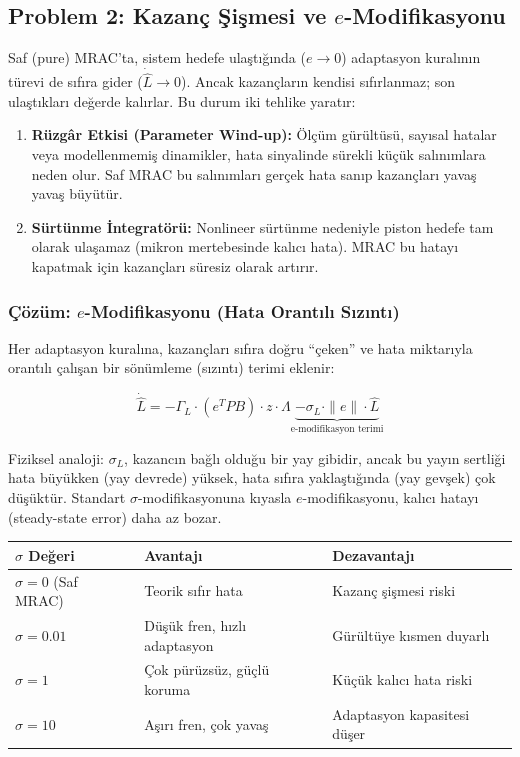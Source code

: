 \documentclass[12pt,a4paper]{article}
\begin{document}
\subsection{Problem 2: Kazanç Şişmesi ve $e$-Modifikasyonu}
\label{subsec:sigma}

Saf (pure) MRAC'ta, sistem hedefe ulaştığında ($e \to 0$) adaptasyon kuralının türevi de sıfıra gider ($\dot{\hat{L}} \to 0$). Ancak kazançların kendisi sıfırlanmaz; son ulaştıkları değerde kalırlar. Bu durum iki tehlike yaratır:

\begin{enumerate}
    \item \textbf{Rüzgâr Etkisi (Parameter Wind-up):} Ölçüm gürültüsü, sayısal hatalar veya modellenmemiş dinamikler, hata sinyalinde sürekli küçük salınımlara neden olur. Saf MRAC bu salınımları gerçek hata sanıp kazançları yavaş yavaş büyütür.
    \item \textbf{Sürtünme İntegratörü:} Nonlineer sürtünme nedeniyle piston hedefe tam olarak ulaşamaz (mikron mertebesinde kalıcı hata). MRAC bu hatayı kapatmak için kazançları süresiz olarak artırır.
\end{enumerate}

\subsubsection{Çözüm: $e$-Modifikasyonu (Hata Orantılı Sızıntı)}

Her adaptasyon kuralına, kazançları sıfıra doğru ``çeken'' ve hata miktarıyla orantılı çalışan bir sönümleme (sızıntı) terimi eklenir:

\begin{equation}
    \dot{\hat{L}} = -\Gamma_L \cdot (e^T P B) \cdot z \cdot \Lambda \underbrace{- \sigma_L \cdot \|e\| \cdot \hat{L}}_{\text{e-modifikasyon terimi}}
\end{equation}

Fiziksel analoji: $\sigma_L$, kazancın bağlı olduğu bir yay gibidir, ancak bu yayın sertliği hata büyükken (yay devrede) yüksek, hata sıfıra yaklaştığında (yay gevşek) çok düşüktür. Standart $\sigma$-modifikasyonuna kıyasla $e$-modifikasyonu, kalıcı hatayı (steady-state error) daha az bozar.

\begin{kavram}
\begin{center}
\begin{tabular}{lll}
\toprule
\textbf{$\sigma$ Değeri} & \textbf{Avantajı} & \textbf{Dezavantajı} \\
\midrule
$\sigma = 0$ (Saf MRAC) & Teorik sıfır hata & Kazanç şişmesi riski \\
$\sigma = 0.01$ & Düşük fren, hızlı adaptasyon & Gürültüye kısmen duyarlı \\
$\sigma = 1$ & Çok pürüzsüz, güçlü koruma & Küçük kalıcı hata riski \\
$\sigma = 10$ & Aşırı fren, çok yavaş & Adaptasyon kapasitesi düşer \\
\bottomrule
\end{tabular}
\end{center}
\end{kavram}
\end{document}
